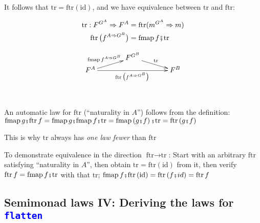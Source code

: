 It follows that {\footnotesize{}$\text{tr}=\text{ftr}\left(\text{id}\right)$},
and we have equivalence between {\footnotesize{}$\text{tr}$} and
{\footnotesize{}$\text{ftr}$}:\texttt{\textcolor{blue}{\footnotesize{} }}%
\begin{minipage}[c][1\totalheight][t]{0.4\columnwidth}%
{\footnotesize{}
\begin{align*}
\text{tr}:F^{G^{A}}\Rightarrow F^{A} & =\text{ftr}(m^{G^{A}}\Rightarrow m)\\
\text{ftr}\,\big(f^{A\Rightarrow G^{B}}\big) & =\text{fmap}\,f\bef\text{tr}
\end{align*}
}%
\end{minipage}\texttt{\textcolor{blue}{\footnotesize{}\hfill{}}}%
\begin{minipage}[c][1\totalheight][t]{0.4\columnwidth}%
{\footnotesize{}
\[
\xymatrix{\xyScaleY{0.2pc}\xyScaleX{3pc} & F^{G^{B}}\ar[rd]\sp(0.5){\ \text{tr}\ }\\
F^{A}\ar[ru]\sp(0.5){\text{fmap}\,f^{A\Rightarrow G^{B}}\ }\ar[rr]\sb(0.5){\text{ftr}\,\big(f^{A\Rightarrow G^{B}}\big)\,} &  & F^{B}
}
\]
}%
\end{minipage}\texttt{\textcolor{blue}{\footnotesize{}\  \  \ \hfill{}}}{\footnotesize\par}

An automatic law for {\footnotesize{}$\text{ftr}$} (``naturality
in $A$'') follows from the definition: {\footnotesize{}$\text{fmap}\,g\bef\text{ftr}\,f=\text{fmap}\,g\bef\text{fmap}\,f\bef\text{tr}=\text{fmap}\left(g\bef f\right)\bef\text{tr}=\text{ftr}\left(g\bef f\right)$} 

This is why {\footnotesize{}$\text{tr}$} always has \emph{one law
fewer} than {\footnotesize{}$\text{ftr}$}{\footnotesize\par}

To demonstrate equivalence in the direction {\footnotesize{}$\text{ftr}\rightarrow\text{tr}$}:
Start with an arbitrary {\footnotesize{}$\text{ftr}$} satisfying
``naturality in $A$'', then obtain {\footnotesize{}$\text{tr}=\text{ftr}\left(\text{id}\right)$}
from it, then verify {\footnotesize{}$\text{ftr}\,f=\text{fmap}\,f\bef\text{tr}$}
with that {\footnotesize{}$\text{tr}$}; {\footnotesize{}$\text{fmap}\,f\bef\text{ftr}\left(\text{id}\right)=\text{ftr}\left(f\bef id\right)=\text{ftr}\,f$}{\footnotesize\par}


\subsection{Semimonad laws IV: Deriving the laws for \texttt{\textcolor{blue}{\footnotesize{}flatten}} }

